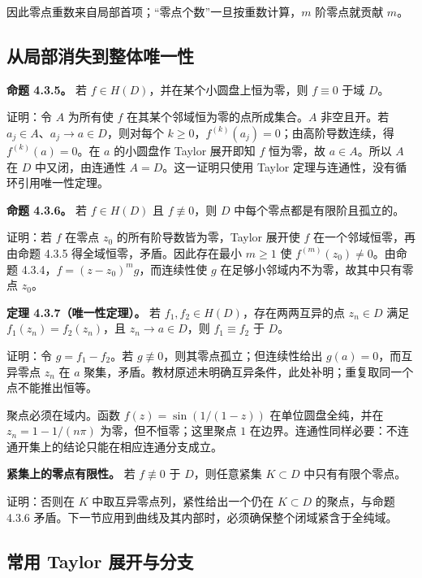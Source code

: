 \documentclass[11pt,a4paper]{article}
\begin{document}
因此零点重数来自局部首项；``零点个数''一旦按重数计算，\(m\) 阶零点就贡献
\(m\)。

\subsection{从局部消失到整体唯一性}\label{ch04-s3-heading-3}

\textbf{命题 4.3.5。} 若 \(f\in H(D)\)，并在某个小圆盘上恒为零，则
\(f\equiv0\) 于域 \(D\)。

证明：令 \(A\) 为所有使 \(f\) 在其某个邻域恒为零的点所成集合。\(A\)
非空且开。若 \(a_j\in A\)、\(a_j\to a\in D\)，则对每个
\(k\ge0\)，\(f^{(k)}(a_j)=0\)；由高阶导数连续，得 \(f^{(k)}(a)=0\)。在
\(a\) 的小圆盘作 Taylor 展开即知 \(f\) 恒为零，故 \(a\in A\)。所以 \(A\)
在 \(D\) 中又闭，由连通性 \(A=D\)。这一证明只使用 Taylor
定理与连通性，没有循环引用唯一性定理。

\textbf{命题 4.3.6。} 若 \(f\in H(D)\) 且 \(f\not\equiv0\)，则 \(D\)
中每个零点都是有限阶且孤立的。

证明：若 \(f\) 在零点 \(z_0\) 的所有阶导数皆为零，Taylor 展开使 \(f\)
在一个邻域恒零，再由命题 4.3.5 得全域恒零，矛盾。因此存在最小 \(m\ge1\)
使 \(f^{(m)}(z_0)\ne0\)。由命题 4.3.4，\(f=(z-z_0)^mg\)，而连续性使
\(g\) 在足够小邻域内不为零，故其中只有零点 \(z_0\)。

\textbf{定理 4.3.7（唯一性定理）。} 若
\(f_1,f_2\in H(D)\)，存在两两互异的点 \(z_n\in D\) 满足
\(f_1(z_n)=f_2(z_n)\)，且 \(z_n\to a\in D\)，则 \(f_1\equiv f_2\) 于
\(D\)。

证明：令 \(g=f_1-f_2\)。若 \(g\not\equiv0\)，则其零点孤立；但连续性给出
\(g(a)=0\)，而互异零点 \(z_n\) 在 \(a\)
聚集，矛盾。教材原述未明确互异条件，此处补明；重复取同一个点不能推出恒等。

聚点必须在域内。函数 \(f(z)=\sin(1/(1-z))\) 在单位圆盘全纯，并在
\(z_n=1-1/(n\pi)\) 为零，但不恒零；这里聚点 \(1\)
在边界。连通性同样必要：不连通开集上的结论只能在相应连通分支成立。

\textbf{紧集上的零点有限性。} 若 \(f\not\equiv0\) 于 \(D\)，则任意紧集
\(K\subset D\) 中只有有限个零点。

证明：否则在 \(K\) 中取互异零点列，紧性给出一个仍在 \(K\subset D\)
的聚点，与命题 4.3.6
矛盾。下一节应用到曲线及其内部时，必须确保整个闭域紧含于全纯域。

\subsection{常用 Taylor 展开与分支}\label{ch04-s3-heading-4}
\end{document}
